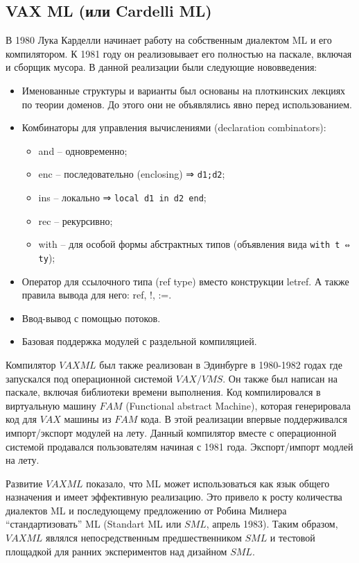 \documentclass[14pt]{matmex-diploma-custom}
\begin{document}
\subsection{VAX ML (или Cardelli ML)}
В 1980 Лука Карделли начинает работу на собственным диалектом ML и его компилятором. К 1981 году он реализовывает его полностью на паскале, включая и сборщик мусора. В данной реализации были следующие нововведения:
\begin{itemize}	
\item Именованные структуры и варианты был основаны на плоткинских лекциях по теории доменов. До этого они не объявлялись явно перед использованием.
\item Комбинаторы для управления вычислениями (declaration combinators):
      \begin{itemize}
	\item and -- одновременно;
	\item enc -- последовательно (enclosing)  ⇒ \verb=d1;d2=;
	\item ins -- локально  ⇒ \verb=local d1 in d2 end=;
	\item rec -- рекурсивно;
	\item with -- для особой формы абстрактных типов (объявления вида \verb=with t ⇔ ty=);
      \end{itemize}
\item Оператор для ссылочного типа (ref type) вместо конструкции letref. А также правила вывода для него: ref, !, :=.
\item Ввод-вывод с помощью потоков.
\item Базовая поддержка модулей с раздельной компиляцией.
\end{itemize}

Компилятор $VAX ML$ был также реализован в Эдинбурге в 1980-1982 годах где запускался под операционной системой $VAX/VMS$. Он также был написан на паскале, включая библиотеки времени выполнения. Код компилировался в  виртуальную машину $FAM$ (Functional abstract Machine), которая генерировала код для $VAX$ машины из $FAM$ кода. В этой реализации впервые поддерживался импорт/экспорт модулей на лету. Данный компилятор вместе с операционной системой продавался пользователям начиная с 1981 года.
Экспорт/импорт модлей на лету.

Развитие $VAX ML$ показало, что ML может использоваться как язык общего назначения и имеет эффективную реализацию. Это привело к росту количества диалектов ML и последующему предложению от Робина Милнера “стандартизовать” ML (Standart ML или $SML$, апрель 1983). Таким образом,  $VAX ML$ являлся непосредственным предшественником $SML$ и тестовой площадкой для ранних экспериментов над дизайном $SML$.
\end{document}

